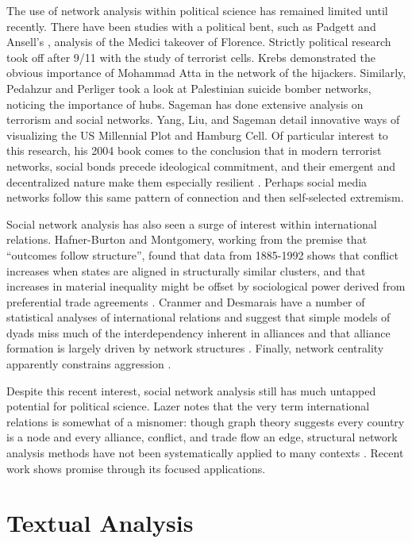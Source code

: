 \documentclass[doublespacing]{utdthesis}
\let\cite=\citep
\begin{document}
The use of network analysis within political science has remained limited until recently.
There have been studies with a political bent, such as Padgett and Ansell’s \citeyear{padgett1993}, analysis of the Medici takeover of Florence.
Strictly political research took off after 9/11 with the study of terrorist cells.
Krebs \citeyear{krebs2002} demonstrated the obvious importance of Mohammad Atta in the network of the hijackers.
Similarly, Pedahzur and Perliger \citeyear{pedahzur2006} took a look at Palestinian suicide bomber networks, noticing the importance of hubs.
Sageman has done extensive analysis on terrorism and social networks.
Yang, Liu, and Sageman \citeyear{yang2006} detail innovative ways of visualizing the US Millennial Plot and Hamburg Cell.
Of particular interest to this research, his 2004 book comes to the
conclusion that in modern terrorist networks, social bonds precede ideological commitment, and their emergent and decentralized nature make them especially resilient \cite{sageman2004}.
Perhaps social media networks follow this same pattern of connection and then self-selected extremism.

Social network analysis has also seen a surge of interest within international relations.
Hafner-Burton and Montgomery, working from the premise that ``outcomes follow structure'', found that data from 1885-1992 shows that conflict increases when states are aligned in structurally similar clusters, and that increases in material inequality might be offset by sociological power derived from preferential trade agreements \cite{hafner2009, hafner2006, hafner2008}.
Cranmer and Desmarais have a number of statistical analyses of international relations and suggest that simple models of dyads miss much of the interdependency inherent in alliances and that alliance formation is largely driven by network structures \cite{cranmer2012, cranmer2012toward}.
Finally, network centrality apparently constrains aggression \cite{kinne2012}.

Despite this recent interest, social network analysis still has much untapped potential for political science.
Lazer notes that the very term international relations is somewhat of a misnomer: though graph theory suggests every country is a node and every alliance, conflict, and trade flow an edge, structural network analysis methods have not been systematically applied to many contexts \cite[p. 63]{lazer2011}.
Recent work shows promise through its focused applications.

\section{Textual Analysis}
\end{document}
